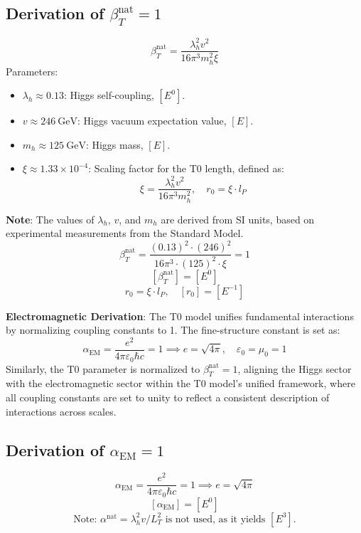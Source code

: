 \documentclass[12pt,a4paper]{article}
\begin{document}
	\subsection{Derivation of \(\beta_T^{\text{nat}} = 1\)}
	\label{subsec:beta_derivation}
	
	\[
	\beta_T^{\text{nat}} = \frac{\lambda_h^2 v^2}{16 \pi^3 m_h^2 \xi}
	\]
	Parameters:
	\begin{itemize}
		\item \(\lambda_h \approx 0.13\): Higgs self-coupling, \([E^0]\).
		\item \(v \approx \SI{246}{\giga\electronvolt}\): Higgs vacuum expectation value, \([E]\).
		\item \(m_h \approx \SI{125}{\giga\electronvolt}\): Higgs mass, \([E]\).
		\item \(\xi \approx 1.33 \times 10^{-4}\): Scaling factor for the T0 length, defined as:
		\[
		\xi = \frac{\lambda_h^2 v^2}{16 \pi^3 m_h^2}, \quad r_0 = \xi \cdot l_P
		\]
	\end{itemize}
	\textbf{Note}: The values of \(\lambda_h\), \(v\), and \(m_h\) are derived from SI units, based on experimental measurements from the Standard Model.
	\[
	\beta_T^{\text{nat}} = \frac{(0.13)^2 \cdot (246)^2}{16 \pi^3 \cdot (125)^2 \cdot \xi} = 1
	\]
	\[
	[\beta_T^{\text{nat}}] = [E^0]
	\]
	\[
	r_0 = \xi \cdot l_P, \quad [r_0] = [E^{-1}]
	\]
	
	\textbf{Electromagnetic Derivation}:
	The T0 model unifies fundamental interactions by normalizing coupling constants to 1. The fine-structure constant is set as:
	\[
	\alpha_{\text{EM}} = \frac{e^2}{4 \pi \varepsilon_0 \hbar c} = 1 \implies e = \sqrt{4 \pi}, \quad \varepsilon_0 = \mu_0 = 1
	\]
	Similarly, the T0 parameter is normalized to \(\beta_T^{\text{nat}} = 1\), aligning the Higgs sector with the electromagnetic sector within the T0 model's unified framework, where all coupling constants are set to unity to reflect a consistent description of interactions across scales.
	
	\subsection{Derivation of \(\alpha_{\text{EM}} = 1\)}
	\label{subsec:alpha_derivation}
	
	\[
	\alpha_{\text{EM}} = \frac{e^2}{4 \pi \varepsilon_0 \hbar c} = 1 \implies e = \sqrt{4 \pi}
	\]
	\[
	[\alpha_{\text{EM}}] = [E^0]
	\]
	\[
	\text{Note: } \alpha^{\text{nat}} = \lambda_h^2 v / L_T^2 \text{ is not used, as it yields } [E^3].
	\]
	
\end{document}
